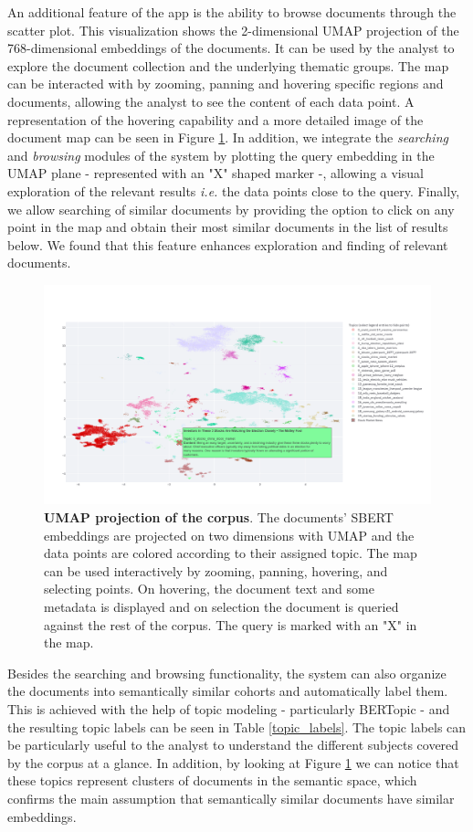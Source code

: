 \documentclass[a4paper]{article}
\begin{document}
An additional feature of the app is the ability to browse documents through the scatter plot. This visualization shows the 2-dimensional UMAP projection of the 768-dimensional embeddings of the documents. It can be used by the analyst to explore the document collection and the underlying thematic groups. The map can be interacted with by zooming, panning and hovering specific regions and documents, allowing the analyst to see the content of each data point. A representation of the hovering capability and a more detailed image of the document map can be seen in Figure \ref{app_map}. In addition, we integrate the \emph{searching} and \emph{browsing} modules of the system by plotting the query embedding in the UMAP plane - represented with an "X" shaped marker -, allowing a visual exploration of the relevant results \emph{i.e.} the data points close to the query. Finally, we allow searching of similar documents by providing the option to click on any point in the map and obtain their most similar documents in the list of results below. We found that this feature enhances exploration and finding of relevant documents.

\begin{figure}[H]
	\centering
	\includegraphics[width=0.8\linewidth]{./assets/map_screenshot}
	\caption{\textbf{UMAP projection of the corpus}. The documents' SBERT embeddings are projected on two dimensions with UMAP and the data points are colored according to their assigned topic. The map can be used interactively by zooming, panning, hovering, and selecting points. On hovering, the document text and some metadata is displayed and on selection the document is queried against the rest of the corpus. The query is marked with an "X" in the map.}
	\label{app_map}
\end{figure}

Besides the searching and browsing functionality, the system can also organize the documents into semantically similar cohorts and automatically label them. This is achieved with the help of topic modeling - particularly BERTopic - and the resulting topic labels can be seen in Table \ref{topic_labels}. The topic labels can be particularly useful to the analyst to understand the different subjects covered by the corpus at a glance. In addition, by looking at Figure \ref{app_map} we can notice that these topics represent clusters of documents in the semantic space, which confirms the main assumption that semantically similar documents have similar embeddings.
\end{document}
